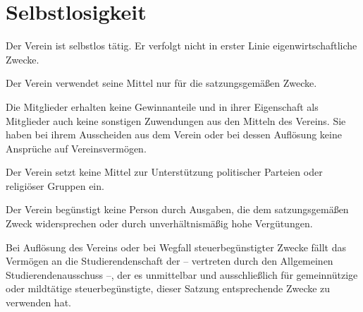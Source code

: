 \section{Selbstlosigkeit}
	\begin{absätze}
		\item Der Verein ist selbstlos tätig. Er verfolgt nicht in erster Linie eigenwirtschaftliche Zwecke.
		\item Der Verein verwendet seine Mittel nur für die satzungsgemäßen Zwecke.
		\item Die Mitglieder erhalten keine Gewinnanteile und in ihrer Eigenschaft als Mitglieder auch keine sonstigen Zuwendungen aus den Mitteln des Vereins. Sie haben bei ihrem Ausscheiden aus dem Verein oder bei dessen Auflösung keine Ansprüche auf Vereinsvermögen.
		\item Der Verein setzt keine Mittel zur Unterstützung politischer Parteien oder religiöser Gruppen ein.
		\item Der Verein begünstigt keine Person durch Ausgaben, die dem satzungsgemäßen Zweck widersprechen oder durch unverhältnismäßig hohe Vergütungen.
		\item Bei Auflösung des Vereins oder bei Wegfall steuerbegünstigter Zwecke fällt das Vermögen an die Studierendenschaft der \Uni{} -- vertreten durch den Allgemeinen Studierendenausschuss --, der es unmittelbar und ausschließlich für gemeinnützige oder mildtätige steuerbegünstigte, dieser Satzung entsprechende Zwecke zu verwenden hat.
	\end{absätze}
